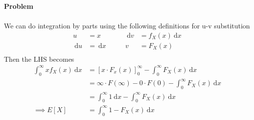 \documentclass[12pt]{article}
\newenvironment{Ex}{\textbf{Problem}\vspace{.75em}\\}{}
\newcommand{\dd}[1]{\:\mathrm{d}{#1}}
\begin{document}
\begin{enumerate}
\begin{Ex}
\begin{solution}
\begin{equation}
\begin{aligned}
        \end{aligned}
      \end{equation}
      We can do integration by parts using the following definitions for
      u-v substitution
      \begin{equation}
        \label{eq:7-u-sub}
        \begin{aligned}
          u &= x \quad&\quad \dd{v}&=f_X(x)\dd{x} \\
          \dd{u}&=\dd{x} \quad&\quad v&=F_X(x) \\
        \end{aligned}
      \end{equation}
      Then the LHS becomes
      \begin{equation}
        \label{eq:7-sol-continued}
        \begin{aligned}
          \int_{0}^{\infty} x f_X(x) \dd{x} &=
          [x\cdot F_x(x)]_{0}^{\infty} - \int_{0}^{\infty}F_X(x)\dd{x} \\
          &= \infty\cdot F(\infty)-0\cdot F(0)-\int_{0}^{\infty}F_X(x)\dd{x} \\
          &= \int_0^{\infty}1\dd{x} - \int_{0}^{\infty}F_X(x)\dd{x} \\
          \implies E[X] &= \int_{0}^{\infty}1-F_X(x)\dd{x} \\
        \end{aligned}
      \end{equation}
    \end{solution}
  \end{Ex}
\end{enumerate}
\end{document}
